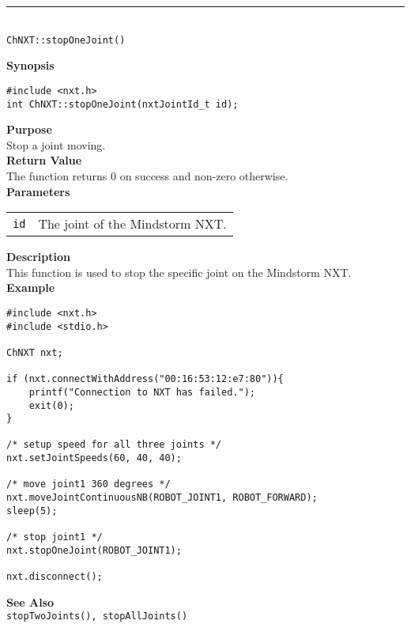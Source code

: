 \noindent
\vspace{5pt}
\rule{4.5in}{0.015in}\\
\noindent
{\LARGE \texttt{ChNXT::stopOneJoint()} }\\


\noindent
{\bf Synopsis}
\vspace{-8pt}
\begin{verbatim}
#include <nxt.h>
int ChNXT::stopOneJoint(nxtJointId_t id);
\end{verbatim}

\noindent
{\bf Purpose}\\
Stop a joint moving.\\

\noindent
{\bf Return Value}\\
The function returns 0 on success and non-zero otherwise.\\

\noindent
{\bf Parameters}\\
\vspace{-0.1in}
\begin{description}
\item
\begin{tabular}{ p{20mm}p{135mm} }
\texttt{id}       &The joint of the Mindstorm NXT.\\
\end{tabular}
\end{description}

\noindent
{\bf Description}\\
This function is used to stop the specific joint on the Mindstorm NXT.\\

\noindent
{\bf Example}
\begin{verbatim}
#include <nxt.h> 
#include <stdio.h>

ChNXT nxt;

if (nxt.connectWithAddress("00:16:53:12:e7:80")){
    printf("Connection to NXT has failed.");
    exit(0);
}
    
/* setup speed for all three joints */
nxt.setJointSpeeds(60, 40, 40);

/* move joint1 360 degrees */
nxt.moveJointContinuousNB(ROBOT_JOINT1, ROBOT_FORWARD);
sleep(5);

/* stop joint1 */
nxt.stopOneJoint(ROBOT_JOINT1);

nxt.disconnect();
\end{verbatim}

\noindent
{\bf See Also}\\
\texttt{stopTwoJoints(), stopAllJoints()}\\
